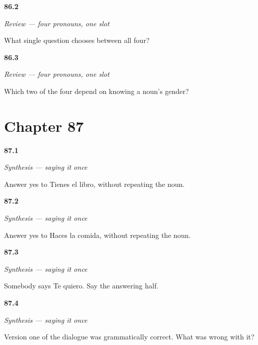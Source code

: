 \noindent\begin{minipage}[t]{\linewidth}
\raggedright
\hypertarget{review-ES-C42-repaso-objeto-question}{\textbf{86.2}} \emph{Review — four pronouns, one slot}\par
\small What single question chooses between all four?
\end{minipage}\par\medskip

\noindent\begin{minipage}[t]{\linewidth}
\raggedright
\hypertarget{review-ES-C42-repaso-objeto-hard}{\textbf{86.3}} \emph{Review — four pronouns, one slot}\par
\small Which two of the four depend on knowing a noun's gender?
\end{minipage}\par\medskip

\section*{Chapter 87}

\noindent\begin{minipage}[t]{\linewidth}
\raggedright
\hypertarget{review-ES-C42-sintesis-decirlo-una-vez-book}{\textbf{87.1}} \emph{Synthesis — saying it once}\par
\small Answer yes to Tienes el libro, without repeating the noun.
\end{minipage}\par\medskip

\noindent\begin{minipage}[t]{\linewidth}
\raggedright
\hypertarget{review-ES-C42-sintesis-decirlo-una-vez-meal}{\textbf{87.2}} \emph{Synthesis — saying it once}\par
\small Answer yes to Haces la comida, without repeating the noun.
\end{minipage}\par\medskip

\noindent\begin{minipage}[t]{\linewidth}
\raggedright
\hypertarget{review-ES-C42-sintesis-decirlo-una-vez-people}{\textbf{87.3}} \emph{Synthesis — saying it once}\par
\small Somebody says Te quiero. Say the answering half.
\end{minipage}\par\medskip

\noindent\begin{minipage}[t]{\linewidth}
\raggedright
\hypertarget{review-ES-C42-sintesis-decirlo-una-vez-point}{\textbf{87.4}} \emph{Synthesis — saying it once}\par
\small Version one of the dialogue was grammatically correct. What was wrong with it?
\end{minipage}\par\medskip

